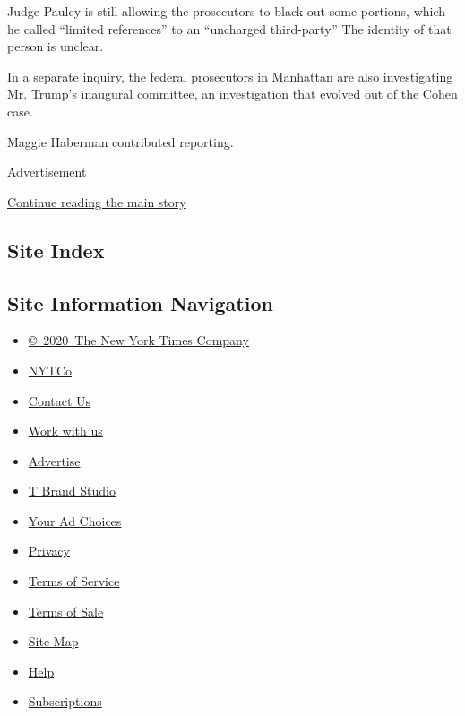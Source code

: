 Judge Pauley is still allowing the prosecutors to black out some
portions, which he called ``limited references'' to an ``uncharged
third-party.'' The identity of that person is unclear.

In a separate inquiry, the federal prosecutors in Manhattan are also
investigating Mr. Trump's inaugural committee, an investigation that
evolved out of the Cohen case.

Maggie Haberman contributed reporting.

Advertisement

\protect\hyperlink{after-bottom}{Continue reading the main story}

\hypertarget{site-index}{%
\subsection{Site Index}\label{site-index}}

\hypertarget{site-information-navigation}{%
\subsection{Site Information
Navigation}\label{site-information-navigation}}

\begin{itemize}
\tightlist
\item
  \href{https://help.nytimes3xbfgragh.onion/hc/en-us/articles/115014792127-Copyright-notice}{©~2020~The
  New York Times Company}
\end{itemize}

\begin{itemize}
\tightlist
\item
  \href{https://www.nytco.com/}{NYTCo}
\item
  \href{https://help.nytimes3xbfgragh.onion/hc/en-us/articles/115015385887-Contact-Us}{Contact
  Us}
\item
  \href{https://www.nytco.com/careers/}{Work with us}
\item
  \href{https://nytmediakit.com/}{Advertise}
\item
  \href{http://www.tbrandstudio.com/}{T Brand Studio}
\item
  \href{https://www.nytimes3xbfgragh.onion/privacy/cookie-policy\#how-do-i-manage-trackers}{Your
  Ad Choices}
\item
  \href{https://www.nytimes3xbfgragh.onion/privacy}{Privacy}
\item
  \href{https://help.nytimes3xbfgragh.onion/hc/en-us/articles/115014893428-Terms-of-service}{Terms
  of Service}
\item
  \href{https://help.nytimes3xbfgragh.onion/hc/en-us/articles/115014893968-Terms-of-sale}{Terms
  of Sale}
\item
  \href{https://spiderbites.nytimes3xbfgragh.onion}{Site Map}
\item
  \href{https://help.nytimes3xbfgragh.onion/hc/en-us}{Help}
\item
  \href{https://www.nytimes3xbfgragh.onion/subscription?campaignId=37WXW}{Subscriptions}
\end{itemize}
